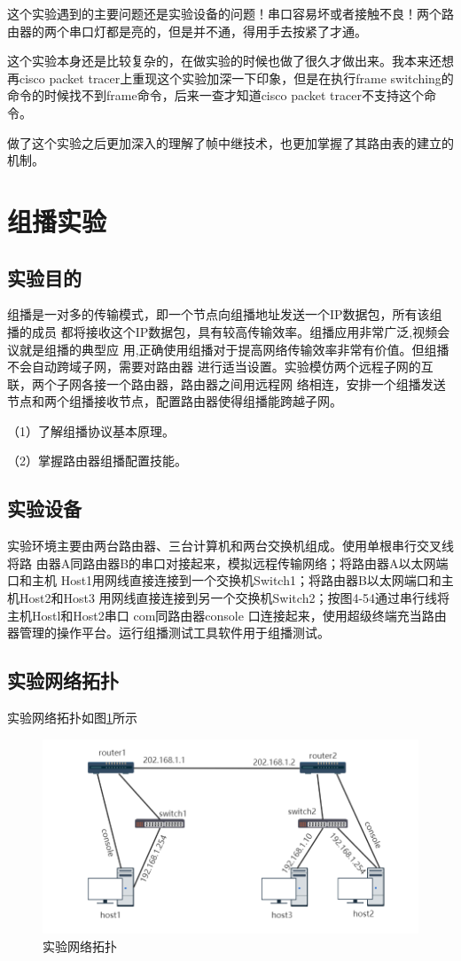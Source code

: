 \documentclass[lang=cn,11pt,a4paper,cite=authoryear]{elegantpaper}
\begin{document}
这个实验遇到的主要问题还是实验设备的问题！串口容易坏或者接触不良！两个路由器的两个串口灯都是亮的，但是并不通，得用手去按紧了才通。

这个实验本身还是比较复杂的，在做实验的时候也做了很久才做出来。我本来还想再cisco packet tracer上重现这个实验加深一下印象，但是在执行frame switching的命令的时候找不到frame命令，后来一查才知道cisco packet tracer不支持这个命令。

做了这个实验之后更加深入的理解了帧中继技术，也更加掌握了其路由表的建立的机制。

\section{组播实验}
\subsection{实验目的}

组播是一对多的传输模式，即一个节点向组播地址发送一个IP数据包，所有该组播的成员 都将接收这个IP数据包，具有较高传输效率。组播应用非常广泛,视频会议就是组播的典型应 用,正确使用组播对于提高网络传输效率非常有价值。但组播不会自动跨域子网，需要对路由器 进行适当设置。实验模仿两个远程子网的互联，两个子网各接一个路由器，路由器之间用远程网 络相连，安排一个组播发送节点和两个组播接收节点，配置路由器使得组播能跨越子网。

（1）了解组播协议基本原理。

（2）掌握路由器组播配置技能。

\subsection{实验设备}

实验环境主要由两台路由器、三台计算机和两台交换机组成。使用单根串行交叉线将路 由器A同路由器B的串口对接起来，模拟远程传输网络；将路由器A以太网端口和主机 Host1用网线直接连接到一个交换机Switch1；将路由器B以太网端口和主机Host2和Host3 用网线直接连接到另一个交换机Switch2；按图4-54通过串行线将主机Hostl和Host2串口 com同路由器console 口连接起来，使用超级终端充当路由器管理的操作平台。运行组播测试工具软件用于组播测试。

\subsection{实验网络拓扑}

实验网络拓扑如图\ref{fig:screenshot026}所示
\begin{figure}[htbp]
	\centering
	\includegraphics[width=0.7\linewidth]{image/screenshot026}
	\caption{实验网络拓扑}
	\label{fig:screenshot026}
\end{figure}
\end{document}
